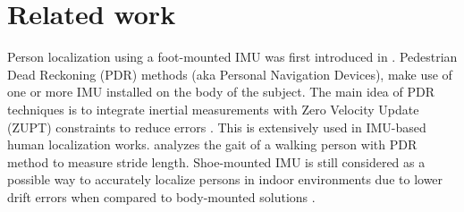 
\section{Related work}\label{sec:relatedWork}

Person localization using a foot-mounted IMU was first introduced in \cite{hutchings1998system}. 
Pedestrian Dead Reckoning (PDR) methods (aka Personal Navigation Devices), make use of one or more IMU installed on the body of the subject.
The main idea of PDR techniques is to integrate inertial measurements with Zero Velocity Update (ZUPT) constraints to reduce errors \cite{ojeda2007personal}.
This is extensively used in IMU-based human localization works.
\cite{kwanmuang2015phd} analyzes the gait of a walking person 
with PDR method to measure stride length.
Shoe-mounted IMU is still considered as a possible way to
accurately localize persons in indoor environments due to lower drift errors when compared to body-mounted solutions \cite{groves2007inertial} . 

